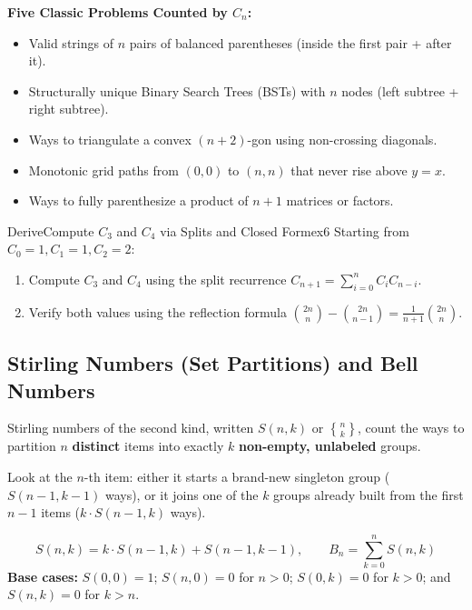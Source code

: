 \documentclass[11pt,a4paper]{article}
\theoremstyle{definition}
\begin{document}
\noindent\textbf{Five Classic Problems Counted by $C_n$:}
\begin{itemize}
    \item Valid strings of $n$ pairs of balanced parentheses (inside the first pair + after it).
    \item Structurally unique Binary Search Trees (BSTs) with $n$ nodes (left subtree + right subtree).
    \item Ways to triangulate a convex $(n + 2)$-gon using non-crossing diagonals.
    \item Monotonic grid paths from $(0, 0)$ to $(n, n)$ that never rise above $y = x$.
    \item Ways to fully parenthesize a product of $n + 1$ matrices or factors.
\end{itemize}

\begin{tryitbox}{Derive}{Compute $C_3$ and $C_4$ via Splits and Closed Form}{ex6}
Starting from $C_0 = 1, C_1 = 1, C_2 = 2$:
\begin{enumerate}
    \item Compute $C_3$ and $C_4$ using the split recurrence $C_{n+1} = \sum_{i=0}^{n} C_i C_{n-i}$.
    \item Verify both values using the reflection formula $\binom{2n}{n} - \binom{2n}{n-1} = \frac{1}{n+1}\binom{2n}{n}$.
\end{enumerate}
\end{tryitbox}

\subsection{Stirling Numbers (Set Partitions) and Bell Numbers}

Stirling numbers of the second kind, written $S(n, k)$ or $\genfrac{\{}{\}}{0pt}{}{n}{k}$, count the ways to partition $n$ \textbf{distinct} items into exactly $k$ \textbf{non-empty, unlabeled} groups.

Look at the $n$-th item: either it starts a brand-new singleton group ($S(n - 1, k - 1)$ ways), or it joins one of the $k$ groups already built from the first $n - 1$ items ($k \cdot S(n - 1, k)$ ways).

\begin{formulabox}
\[
    S(n, k) = k \cdot S(n - 1, k) + S(n - 1, k - 1),
    \qquad
    B_n = \sum_{k=0}^{n} S(n, k)
\]
\textbf{Base cases:} $S(0, 0) = 1$;\; $S(n, 0) = 0$ for $n > 0$;\; $S(0, k) = 0$ for $k > 0$;\; and $S(n, k) = 0$ for $k > n$.
\end{formulabox}
\end{document}
